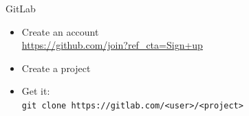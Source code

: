 \documentclass[English,c,%
hyperref={%
    pdftitle={FISA-DE2 OOP in Java},%
    pdfauthor={Muller, Gravier, Laforest, Subercaze},%
    pdfsubject={OOP in Java},%
    pdfkeywords={OOP, Java},%
    colorlinks=true,%
    urlcolor=blue,%
    linkcolor=%
    },%
xcolor={pdftex,svgnames} %
]{beamer}
\begin{document}
\begin{frame}{GitLab \href{https://gitlab.com}{\color{white}{[1]}}}
  \begin{itemize}
    \item<1-> Create an account\\
    \url{https://github.com/join?ref_cta=Sign+up}
    \bigskip
%
    \item<2-> Create a project\\
    \bigskip
%
    \item<4-> Get it:\\
    { \small
      \texttt{git clone https://gitlab.com/<user>/<project>}
    }
  \end{itemize}
\end{frame}
\end{document}
